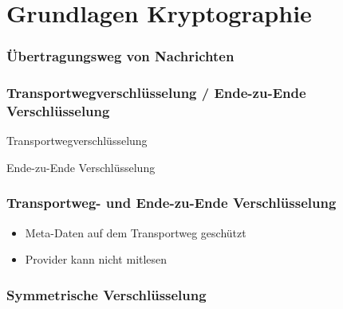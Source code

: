 \section{Grundlagen Kryptographie}


\begin{frame}
  \frametitle{Übertragungsweg von Nachrichten}
  \center {}
\end{frame}

\begin{frame}
  \frametitle{Transportwegverschlüsselung / Ende-zu-Ende Verschlüsselung}
  Transportwegverschlüsselung
  \begin{center}
  \end{center}


  Ende-zu-Ende Verschlüsselung
  \center {}
\end{frame}

\begin{frame}
  \frametitle{Transportweg- und Ende-zu-Ende Verschlüsselung}
  \begin{center}
  \end{center}
  \begin{itemize}
    \item Meta-Daten auf dem Transportweg geschützt
    \item Provider kann nicht mitlesen
  \end{itemize}
\end{frame}


\begin{frame}
  \frametitle{Symmetrische Verschlüsselung}
  \begin{columns}[c]
    \begin{column}{0.5\textwidth}
      \center {}
    \end{column}
  \end{columns}
\end{frame}

